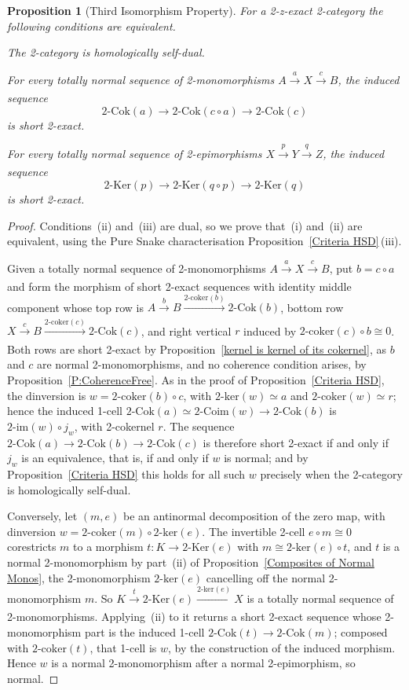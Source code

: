 \documentclass[reqno,a4paper]{amsart}
\numberwithin{equation}{section}
\theoremstyle{plain}
\newtheorem{proposition}[subsection]{Proposition}
\theoremstyle{definition}
\def\nameit#1{\textrm{#1}~}
\def\prox{\nameit{Proposition}}
\newcommand{\comp}{\circ}
\newcommand{\iso}{\cong}
\renewcommand{\1}{\onecat{1}}
\newcommand{\TwoKer}{\ensuremath{2\text{-}\mathrm{Ker}}}
\newcommand{\TwoCoker}{\ensuremath{2\text{-}\mathrm{Cok}}}
\newcommand{\twoker}{\ensuremath{2\text{-}\mathrm{ker}}}
\newcommand{\twocoker}{\ensuremath{2\text{-}\mathrm{coker}}}
\newcommand{\twoimg}{\ensuremath{2\text{-}\mathrm{im}}}
\newcommand{\TwoCoim}{\ensuremath{2\text{-}\mathrm{Coim}}}
\newcommand{\aar}[2][]{\xrightarrow[#1]{#2}}
\begin{document}
\begin{proposition}[Third Isomorphism Property]\label{Third Iso}
	For a 2-z-exact 2-category the following conditions are equivalent.
	\begin{tfae}
		\item The 2-category is homologically self-dual.
		\item For every totally normal sequence of 2-monomorphisms \(A\aar{a}X\aar{c}B\), the induced sequence
		\[
			\TwoCoker(a)\longrightarrow\TwoCoker(c\comp a)\longrightarrow\TwoCoker(c)
		\]
		is short 2-exact.
		\item For every totally normal sequence of 2-epimorphisms \(X\aar{p}Y\aar{q}Z\), the induced sequence
		\[
			\TwoKer(p)\longrightarrow\TwoKer(q\comp p)\longrightarrow\TwoKer(q)
		\]
		is short 2-exact.
	\end{tfae}
\end{proposition}
\begin{proof}
	Conditions~(ii) and~(iii) are dual, so we prove that~(i) and~(ii) are equivalent, using the Pure Snake characterisation \prox\ref{Criteria HSD}\,\textup{(iii)}.

	Given a totally normal sequence of 2-monomorphisms \(A\aar{a}X\aar{c}B\), put \(b=c\comp a\) and form the morphism of short 2-exact sequences with identity middle component whose top row is \(A\aar{b}B\aar{\twocoker(b)}\TwoCoker(b)\), bottom row \(X\aar{c}B\aar{\twocoker(c)}\TwoCoker(c)\), and right vertical \(r\) induced by \(\twocoker(c)\comp b\iso 0\). Both rows are short 2-exact by \prox\ref{kernel is kernel of its cokernel}, as \(b\) and \(c\) are normal 2-monomorphisms, and no coherence condition arises, by \prox\ref{P:CoherenceFree}. As in the proof of \prox\ref{Criteria HSD}, the dinversion is \(w=\twocoker(b)\comp c\), with \(\twoker(w)\simeq a\) and \(\twocoker(w)\simeq r\); hence the induced 1-cell \(\TwoCoker(a)\simeq\TwoCoim(w)\to\TwoCoker(b)\) is \(\twoimg(w)\comp j_w\), with 2-cokernel \(r\). The sequence \(\TwoCoker(a)\to\TwoCoker(b)\to\TwoCoker(c)\) is therefore short 2-exact if and only if \(j_w\) is an equivalence, that is, if and only if \(w\) is normal; and by \prox\ref{Criteria HSD} this holds for all such \(w\) precisely when the 2-category is homologically self-dual.

	Conversely, let \((m,e)\) be an antinormal decomposition of the zero map, with dinversion \(w=\twocoker(m)\comp\twoker(e)\). The invertible 2-cell \(e\comp m\iso 0\) corestricts \(m\) to a morphism \(t\colon K\to\TwoKer(e)\) with \(m\iso\twoker(e)\comp t\), and \(t\) is a normal 2-monomorphism by part~\textup{(ii)} of \prox\ref{Composites of Normal Monos}, the 2-monomorphism \(\twoker(e)\) cancelling off the normal 2-monomorphism \(m\). So \(K\aar{t}\TwoKer(e)\aar{\twoker(e)}X\) is a totally normal sequence of 2-monomorphisms. Applying~(ii) to it returns a short 2-exact sequence whose 2-monomorphism part is the induced 1-cell \(\TwoCoker(t)\to\TwoCoker(m)\); composed with \(\twocoker(t)\), that 1-cell is \(w\), by the construction of the induced morphism. Hence \(w\) is a normal 2-monomorphism after a normal 2-epimorphism, so normal.
\end{proof}
\end{document}
